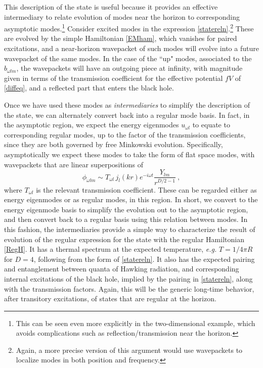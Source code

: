 \documentclass[12pt]{article}
\numberwithin{equation}{section}
\newcommand{\beq}{\begin{equation}}
\newcommand{\eeq}{\end{equation}}
\begin{document}
This description of the state is useful because it provides an effective intermediary to relate evolution of modes near the horizon to corresponding asymptotic modes.\footnote{This can be seen even more explicitly in the two-dimensional example\cite{SE2d}, which avoids complications such as reflection/transmission near the horizon.}  Consider  excited modes in the expression \eqref{statereln}.\footnote{Again, a more precise version of this argument would use wavepackets to localize modes in both position and frequency.}  These are evolved by the simple Hamiltonian \eqref{EMham}, which vanishes for paired excitations, and a near-horizon wavepacket of such modes will evolve into a future wavepacket of the same modes.  In the case of the ``up" modes, associated to the $b_{\omega l m}$, the wavepackets will have an outgoing piece at infinity, with magnitude given in terms of the transmission coefficient for the effective potential $fV$ of \eqref{diffeq}, and a reflected part that enters the black hole.

Once we have used these modes as {\it intermediaries} to simplify the description of the state, we can alternately convert back into a regular mode basis.  In fact, in the asymptotic region, we expect the energy eigenmodes $u_{\omega l}$ to equate to corresponding regular modes, up to the factor of the transmission coefficients, since they are both governed by free Minkowski evolution.   Specifically, asymptotically we expect these modes to take the form of flat space modes, with wavepackets that are linear superpositions of
\beq
\phi_{\omega l m} \sim T_{\omega l}\, j_l(kr) e^{-i\omega t}\frac{Y_{lm}}{r^{D/2-1}}\ ,
\eeq
where $T_{\omega l}$ is the relevant transmission coefficient.  These can be regarded either as energy eigenmodes or as regular modes, in this region.
 In short, we convert to the energy eigenmode basis to simplify the evolution out to the asymptotic region, and then convert back to a regular basis using this relation between modes.
In this fashion, the intermediaries provide a simple way to characterize the result of evolution of the regular expression for the state with the regular Hamiltonian \eqref{RegH}.   It has a thermal spectrum at the expected temperature, {\it e.g.}  $T=1/4\pi R$ for $D=4$, following from the form of \eqref{statereln}.  It also has the expected pairing and entanglement between  quanta of Hawking radiation, and corresponding internal excitations of the black hole, implied by the pairing in  \eqref{statereln}, along with the transmission factors.  Again, this will be the generic long-time behavior, after transitory excitations, of states that are regular at the horizon.
\end{document}
